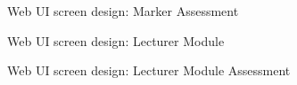 \begin{figure}[H]
\centering	
{}
\caption{Web UI screen design: Marker Assessment}
\end{figure}

\begin{figure}[H]
\centering	
{}
\caption{Web UI screen design: Lecturer Module}
\end{figure}

\begin{figure}[H]
\centering	
{}
\caption{Web UI screen design: Lecturer Module Assessment}
\end{figure}


